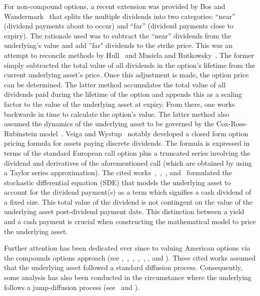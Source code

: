 For non-compound options, a recent extension was provided by Bos and  Wandermark~\cite{Bos2002} that splits the multiple dividends into two categories: ``near'' (dividend payments about to occur) and ``far'' (dividend payments close to expiry). The rationale used was to subtract the ``near'' dividends from the underlying's value and add ''far" dividends to the strike price. This was an attempt to reconcile methods by Hull~\cite[pp. 298]{Hull1989} and Musiela and Rutkowsky~\cite[pp. 53--54]{Musiela1997}. The former simply subtracted the total value of all dividends in the option's lifetime from the current underlying asset's price. Once this adjustment is made, the option price can be determined. The latter method accumulates the total value of all dividends paid during the lifetime of the option and appends this as a scaling factor to the value of the underlying asset at expiry. From there, one works backwards in time to calculate the option's value. The latter method also assumed the dynamics of the underlying asset to be governed by the Cox-Ross-Rubinstein model~\cite{Cox1979}. Veiga and Wystup~\cite{Veiga2009} notably developed a closed form option pricing formula for assets paying discrete dividends. The formula is expressed in terms of the standard European call option plus a truncated series involving the dividend and derivatives of the aforementioned call (which are obtained by using a Taylor series approximation). The cited works~\cite{Roll1977},~\cite{Geske1979},~\cite{Bos2002}, and~\cite{Veiga2009} formulated the stochastic differential equation (SDE) that models the underlying asset to account for the dividend payment(s) as a term which signifies a cash dividend of a fixed size. This total value of the dividend is not contingent on the value of the underlying asset post-dividend payment date. This distinction between a yield and a cash payment is crucial when constructing the mathematical model to price the underlying asset.

Further attention has been dedicated ever since to valuing American options via the compounds options approach (see \cite{Geske1984},~\cite{Omberg1987},~\cite{Bunch1992},~\cite{Breen1991},~\cite{Ho1997}, \cite{Chang2001}, and \cite{Zhylyevskyy2010}). These cited works assumed that the underlying asset followed a standard diffusion process. Consequently, some analysis has also been conducted in the circumstance where the underlying follows a jump-diffusion process (see~\cite{Gukhal2003} and \cite{Li2005}).


